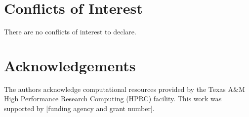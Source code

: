 \documentclass[twoside, twocolumn]{article}
\begin{document}
\section*{Conflicts of Interest}
There are no conflicts of interest to declare.

\section*{Acknowledgements}
The authors acknowledge computational resources provided by the Texas A\&M High Performance Research Computing (HPRC) facility. This work was supported by [funding agency and grant number].



\end{document}
